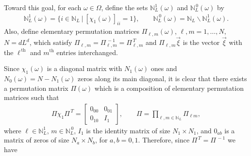 \documentclass{cmslatex}
\begin{document}
Toward this goal,
for each $\omega\in\Omega$, define the sets $\mathbb{N}_L^1(\omega)$ and
$\mathbb{N}_L^{\,0}(\omega)$ by
% 
\begin{align}\label{eq:Zero_One_indices}
  \mathbb{N}_L^1(\omega)=\{i\in\mathbb{N}_L \ | \ [\chi_1(\omega)]_{ii}=1\}, \qquad
  \mathbb{N}_L^{\,0}(\omega)=\mathbb{N}_L\backslash \mathbb{N}_L^1(\omega).
\end{align}
%
Also, define elementary permutation matrices \cite{Demmel:1997}
$\Pi_{\ell,m}(\omega)$, $\ell,m=1,\ldots,N$, $N=dL^d$, which satisfy
$\Pi_{\ell,m}=\Pi_{\ell,m}^{\,-1}=\Pi_{\ell,m}^{\,T}$ and $\Pi_{\ell,m}\vec{\xi}$ is the
vector $\vec{\xi}$ with the $\ell^{\,\text{th}}$ and $m^{\text{th}}$
entries interchanged. 




Since $\chi_1(\omega)$ is a diagonal matrix with $N_1(\omega)$ ones and
$N_0(\omega)=N-N_1(\omega)$ zeros along its main diagonal, it is clear that
there exists a permutation matrix $\Pi(\omega)$ which is a composition of
elementary permutation matrices such that 
%
\begin{align}\label{eq:chi_Perm} 
  \Pi\chi_1\Pi^{\,T}= 
  \left[
  \begin{array}{ccc}
    0_{00}&0_{01}\\
    0_{10}&I_1   
    \end{array}
\right],
\qquad
\Pi=\prod_{\ell,m\in\mathbb{N}_L}\Pi_{\ell m},
\end{align}
%
where $\ell\in\mathbb{N}_L^1$, $m\in\mathbb{N}_L^{\,0}$, $I_1$ is the
identity matrix of size $N_1\times N_1$, and $0_{ab}$ is a matrix of zeros
of size $N_a\times N_b$, for $a,b=0,1$. Therefore, since  $\Pi^{\,T}=\Pi^{\,-1}$
we have 
%
\end{document}
